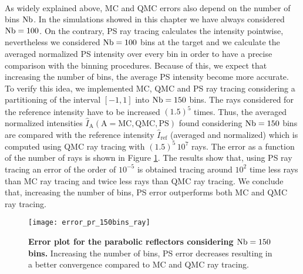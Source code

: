 \\ \indent As widely explained above, MC and QMC errors also depend on the number of bins $\textrm{Nb}$. In the simulations showed in this chapter we have always considered $\textrm{Nb} = 100$. On the contrary, PS ray tracing calculates the intensity pointwise, nevertheless we considered $\textrm{Nb} = 100$ bins at the target and we calculate the averaged normalized PS intensity over every bin in order to have a precise comparison with the binning procedures. Because of this, we expect that increasing the number of bins, the average PS intensity become more accurate. To verify this idea, we implemented MC, QMC and PS ray tracing considering a partitioning of the interval $[-1,1]$ into $\textrm{Nb} = 150$ bins. The rays considered for the reference intensity have to be increased $(1.5)^5$ times. Thus, the averaged normalized intensities $\hat{I}_{\textrm{A}} (\textrm{A}=\textrm{MC}, \textrm{QMC}, \textrm{PS})$ found considering $\textrm{Nb}=150$ bins are compared with the reference intensity $\hat{I}_{\textrm{ref}}$ (averaged and normalized) which is computed using QMC ray tracing with $(1.5)^5\, 10^7$ rays. The error as a function of the number of rays is shown in Figure \ref{fig:error_pr_150_bin}. The results show that, using PS ray tracing an error of the order of $10^{-5}$ is obtained tracing around $10^2$ time less rays than MC ray tracing and twice less rays than QMC ray tracing. We conclude that, increasing the number of bins, PS error outperforms both MC and QMC ray tracing.
\begin{figure}[h]
  \center
  \texttt{[image: error\_pr\_150bins\_ray]}
  \caption{\textbf{Error plot for the parabolic reflectors considering $\textrm{Nb}=150$ bins.} Increasing the number of bins, PS error decreases resulting in a better convergence compared to MC and QMC ray tracing.}
  \label{fig:error_pr_150_bin}
\end{figure}
